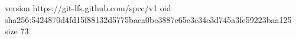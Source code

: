 version https://git-lfs.github.com/spec/v1
oid sha256:5424870d4fd15f88132d5775baca0bc3887c65c3c34e3d745a3fe59223baa125
size 73

